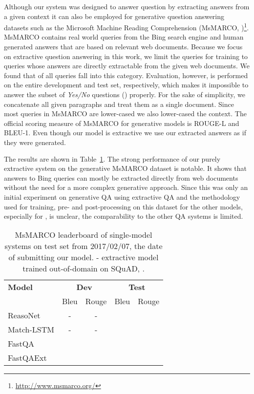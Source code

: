 \documentclass[11pt,a4paper]{article}
\begin{document}
Although our system was designed to answer question by extracting answers from a given context it can also be employed for generative question answering datasets such as the Microsoft Machine Reading Comprehension (MsMARCO, )\footnote{\url{http://www.msmarco.org/}}. MsMARCO contains  real world queries from the Bing search engine and human generated answers that are based on relevant web documents. Because we focus on extractive question answering in this work, we limit the queries for training to queries whose answers are directly extractable from the given web documents. We found that  of all queries fall into this category. Evaluation, however, is performed on the entire development and test set, respectively, which makes it impossible to answer the subset of \textit{Yes/No} questions () properly. For the sake of simplicity, we concatenate all given paragraphs and treat them as a single document. Since most queries in MsMARCO are lower-cased we also lower-cased the context. The official scoring measure of MsMARCO for generative models is ROUGE-L and BLEU-1. Even though our model is extractive we use our extracted answers as if they were generated.

The results are shown in Table~\ref{tab:MsMARCO_results}. The strong performance of our purely extractive system on the generative MsMARCO dataset is notable. It shows that answers to Bing queries can mostly be extracted directly from web documents without the need for a more complex generative approach. Since this was only an initial experiment on generative QA using extractive QA and the methodology used for training, pre- and post-processing on this dataset for the other models, especially for , is unclear, the comparability to the other QA systems is limited.


\begin{table}[t]
    \centering
    \small
    \begin{tabular}{l c c c c}
        \toprule
        \textbf{Model} & \multicolumn{2}{c}{\textbf{Dev}} & \multicolumn{2}{c}{\textbf{Test}} \\
        & Bleu & Rouge & Bleu & Rouge \\
        \midrule
        ReasoNet & - & - &  &  \\
        Match-LSTM & - & - &  &  \\ 
        \midrule
        FastQA  &  &  &  &   \\
        FastQAExt  &  &  &  &  \\
        \bottomrule
    \end{tabular}
    \caption{MsMARCO leaderboard of single-model  systems on  test  set  from  2017/02/07,  the date  of  submitting  our  model. - extractive model trained out-of-domain on SQuAD, .}
    \label{tab:MsMARCO_results}
\end{table}
\end{document}
